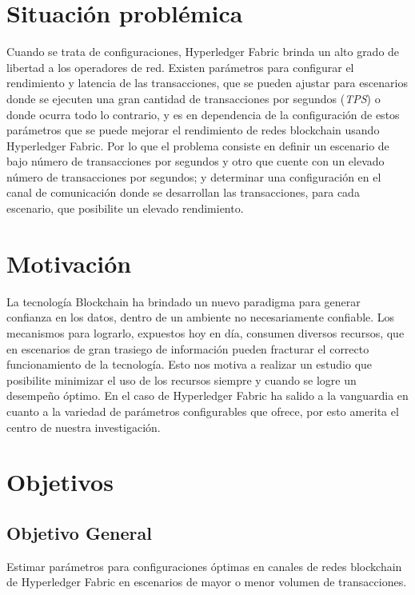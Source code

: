 \section{Situaci\'on probl\'emica}
Cuando se trata de configuraciones, Hyperledger Fabric brinda un alto grado de libertad a los operadores de red. Existen par\'ametros para configurar el rendimiento y latencia de las transacciones, que se pueden ajustar para escenarios donde se ejecuten una gran cantidad de transacciones por segundos (\emph{TPS}) o donde ocurra todo lo contrario, y es en dependencia de la configuraci\'on de estos par\'ametros que se puede mejorar el rendimiento de redes blockchain usando Hyperledger Fabric. 
Por lo que el problema consiste en definir un escenario de bajo n\'umero de transacciones por segundos y otro que cuente con un elevado n\'umero de transacciones por segundos; y determinar una configuraci\'on en el canal de comunicaci\'on donde se desarrollan las transacciones, para cada escenario, que posibilite un elevado rendimiento.

\section{Motivaci\'on}
La tecnolog\'ia Blockchain ha brindado un nuevo paradigma para generar confianza en los datos, dentro de un ambiente no necesariamente confiable. Los mecanismos para lograrlo, expuestos hoy en d\'ia, consumen diversos recursos, que en escenarios de gran trasiego de informaci\'on pueden fracturar el correcto funcionamiento de la tecnolog\'ia. Esto nos motiva a realizar un estudio que posibilite minimizar el uso de los recursos siempre y cuando se logre un desempe\~no \'optimo. En el caso de Hyperledger Fabric ha salido a la vanguardia en cuanto a la variedad de par\'ametros configurables que ofrece, por esto amerita el centro de nuestra investigaci\'on.


\section{Objetivos}
\subsection{Objetivo General}
Estimar par\'ametros para configuraciones \'optimas en canales de redes blockchain de Hyperledger Fabric en escenarios de mayor o menor volumen de transacciones.

{\vspace{0.5 cm}}

